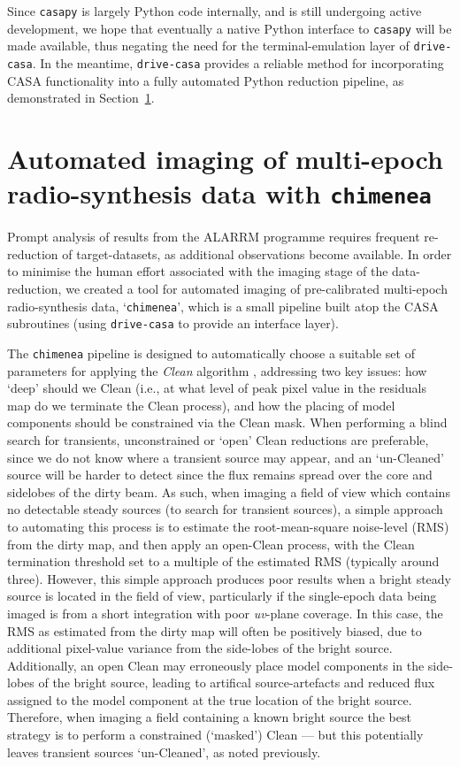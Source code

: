 \documentclass[5p,authoryear]{elsarticle}
\begin{document}
Since \texttt{casapy} is largely Python code internally, and is still undergoing active development, we hope that eventually a native Python interface to \texttt{casapy} will be made available, thus negating the need for the terminal-emulation layer of \texttt{drive-casa}. 
In the meantime, \texttt{drive-casa} provides a reliable method for incorporating CASA functionality into a fully automated Python reduction pipeline, as demonstrated in Section~\ref{sec:chimenea}.



\section{Automated imaging of multi-epoch radio-synthesis data with \texttt{chimenea}}
\label{sec:chimenea}
Prompt analysis of results from the ALARRM programme requires frequent re-reduction of target-datasets, as additional observations become available.
In order to minimise the human effort associated with the imaging stage of the data-reduction, we created a tool for automated imaging of pre-calibrated multi-epoch radio-synthesis data, `\texttt{chimenea}', which is a small pipeline built atop the CASA subroutines (using \texttt{drive-casa} to provide an interface layer). 

The \texttt{chimenea} pipeline is designed to automatically choose a suitable set of parameters for applying the \textit{Clean} algorithm \citep{Hogbom1974,Schwab1984}, addressing two key issues: how `deep' should we Clean (i.e., at what level of peak pixel value in the residuals map do we terminate the Clean process), and how the placing of model components should be constrained via the Clean mask. 
When performing a blind search for transients, unconstrained or `open' Clean reductions are preferable, since we do not know where a transient source may appear, and an `un-Cleaned' source will be harder to detect since the flux remains spread over the core and sidelobes of the dirty beam. 
As such, when imaging a field of view which contains no detectable steady sources (to search for transient sources), a simple approach to automating this process is to estimate the root-mean-square noise-level (RMS) from the dirty map, and then apply an open-Clean process, with the Clean termination threshold set to a multiple of the estimated RMS (typically around three). 
However, this simple approach produces poor results when a bright steady source is located in the field of view, particularly if the single-epoch data being imaged is from a short integration with poor \textit{uv}-plane coverage.
In this case, the RMS as estimated from the dirty map will often be positively biased, due to additional pixel-value variance from the side-lobes of the bright source. 
Additionally, an open Clean may erroneously place model components in the side-lobes of the bright source, leading to artifical source-artefacts and reduced flux assigned to the model component at the true location of the bright source.
Therefore, when imaging a field containing a known bright source the best strategy is to perform a constrained (`masked') Clean --- but this potentially leaves transient sources `un-Cleaned', as noted previously.
\end{document}

